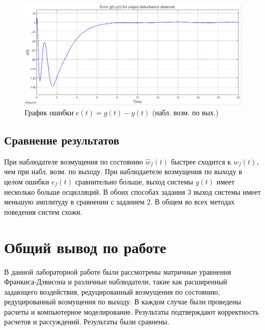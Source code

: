 \documentclass[a4paper, 12pt]{article}
\begin{document}
    \begin{figure}[H]
        \centering
        \includegraphics[scale=0.6]{3task_ey2.png}
        \captionsetup{skip=0pt}
        \caption{График ошибки $e(t)=g(t)-y(t)$ (набл. возм. по вых.)}
        \label{fig:3task_ey2}
    \end{figure}


    \subsection{Сравнение результатов}
    При наблюдателе возмущения по состоянию $\hat{w}_f(t)$
    быстрее сходится к $w_f(t)$, чем при набл. возм. по выходу.
    При наблюдаетеле возмущения по выходу в целом ошибки $e_f(t)$
    сравнительно больше, выход системы $y(t)$ имеет несколько больше осцилляций.
    В обоих способах задания 3 выход системы имеет
    меньшую амплитуду в сравнении с заданием 2. В общем во всех методах
    поведения систем схожи.


    \section{Общий вывод по работе}
    В данной лабораторной работе были рассмотрены матричные
    уравнения Франкиса-Дэвисона и различные наблюдатели,
    такие как расширенный задающего воздействия, редуцированный возмущения по состоянию,
    редуцированный возмущения по выходу. В каждом случае были проведены
    расчеты и компьютерное моделирование. Результаты подтверждают
    корректность расчетов и рассуждений. Результаты были сравнены.
\end{document}

